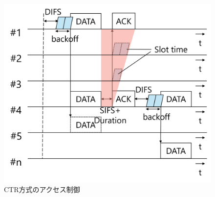 \documentclass[a4paper,10pt]{ltjsarticle}
\begin{document}
\begin{figure}[H]
  \centering
  \includegraphics[width=\linewidth]{ctr_accsess.png} %
  \caption{CTR方式のアクセス制御}
  \label{fig:CTR方式のアクセス制御} %
\end{figure}
\end{document}
